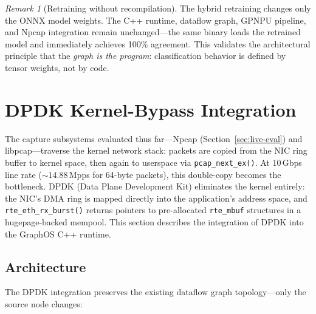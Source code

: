 \documentclass[11pt,a4paper,twoside]{article}
\theoremstyle{definition}
\theoremstyle{remark}
\newtheorem{remark}{Remark}[section]
\begin{document}
\begin{remark}[Retraining without recompilation]
The hybrid retraining changes only the ONNX model weights. The C++ runtime, dataflow graph, GPNPU pipeline, and Npcap integration remain unchanged---the same binary loads the retrained model and immediately achieves 100\% agreement. This validates the architectural principle that the \emph{graph is the program}: classification behavior is defined by tensor weights, not by code.
\end{remark}


\section{DPDK Kernel-Bypass Integration}
\label{sec:dpdk}

The capture subsystems evaluated thus far---Npcap (Section~\ref{sec:live-eval}) and libpcap---traverse the kernel network stack: packets are copied from the NIC ring buffer to kernel space, then again to userspace via \texttt{pcap\_next\_ex()}. At 10\,Gbps line rate (${\sim}14.88$\,Mpps for 64-byte packets), this double-copy becomes the bottleneck. DPDK (Data Plane Development Kit) eliminates the kernel entirely: the NIC's DMA ring is mapped directly into the application's address space, and \texttt{rte\_eth\_rx\_burst()} returns pointers to pre-allocated \texttt{rte\_mbuf} structures in a hugepage-backed mempool. This section describes the integration of DPDK into the GraphOS C++ runtime.

\subsection{Architecture}

The DPDK integration preserves the existing dataflow graph topology---only the source node changes:
\end{document}
